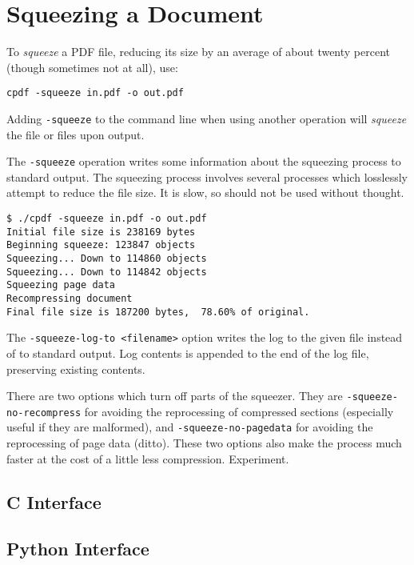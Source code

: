 \documentclass{book}
\begin{document}
  \section{Squeezing a Document}
  To \textit{squeeze} a PDF file, reducing its size by an average of about twenty percent (though sometimes not at all), use:
  \begin{framed}
    \small\verb!cpdf -squeeze in.pdf -o out.pdf!
  \end{framed}
  \noindent Adding \texttt{-squeeze} to the command line when using another operation will \textit{squeeze} the file or files upon output.
  
  The \texttt{-squeeze} operation writes some information about the squeezing process to standard output. The squeezing process involves several processes which losslessly attempt to reduce the file size. It is slow, so should not be used without thought.

\begin{verbatim}
$ ./cpdf -squeeze in.pdf -o out.pdf
Initial file size is 238169 bytes
Beginning squeeze: 123847 objects
Squeezing... Down to 114860 objects
Squeezing... Down to 114842 objects
Squeezing page data
Recompressing document
Final file size is 187200 bytes,  78.60% of original.
\end{verbatim}

\noindent The \texttt{-squeeze-log-to <filename>} option writes the log to the given file instead of to standard output. Log contents is appended to the end of the log file, preserving existing contents.

There are two options which turn off parts of the squeezer. They are \texttt{-squeeze-no-recompress} for avoiding the reprocessing of compressed sections (especially useful if they are malformed), and \texttt{-squeeze-no-pagedata} for avoiding the reprocessing of page data (ditto). These two options also make the process much faster at the cost of a little less compression. Experiment.

\begin{cpdflib}
\clearpage
\section*{C Interface}
\begin{small}\tt

\end{small}
\end{cpdflib}

\begin{pycpdflib}
\clearpage
\section*{Python Interface}
\begin{small}\tt

\end{small}
\end{pycpdflib}
\end{document}
